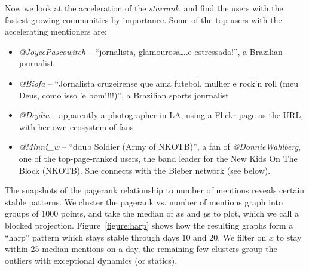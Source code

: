 \documentclass[10pt,oneside]{memoir}
\begin{document}
\begin{Spacing}{2}
Now we look at the acceleration of the {\itshape starrank}, and find the users with the fastest growing communities by importance.  Some of the top users with the accelerating mentioners are:


\begin{itemize}


\item {\itshape @JoycePascowitch} -- ``jornalista, glamourosa{\ldots}.e estressada!'', a Brazilian journalist

\item {\itshape @Biofa} -- ``Jornalista cruzeirense que ama futebol, mulher e rock'n roll (meu Deus, como isso '{e} bom!!!!)'', a Brazilian sports journalist

\item {\itshape @Dejdia} -- apparently a photographer in LA, using a Flickr page as the URL, with her own ecosystem of fans

\item \emph{@Minni\_w} -- ``ddub Soldier (Army of NKOTB)'', a fan of {\itshape @DonnieWahlberg}, one of the top-page-ranked users, the band leader for the New Kids On The Block (NKOTB).  She connects with the Bieber network (see below).
\end{itemize}

The snapshots of the pagerank relationship to number of mentions reveals certain stable patterns.  We cluster the pagerank vs. number of mentions graph into groups of 1000 points, and take the median of $x$s and $y$s to plot, which we call a blocked projection.  Figure~\ref{figure:harp} shows how the resulting graphs form a ``harp'' pattern which stays stable through days 10 and 20.  We filter on $x$ to stay within 25 median mentions on a day, the remaining few clusters group the outliers with exceptional dynamics (or statics).




\end{Spacing}
\end{document}
